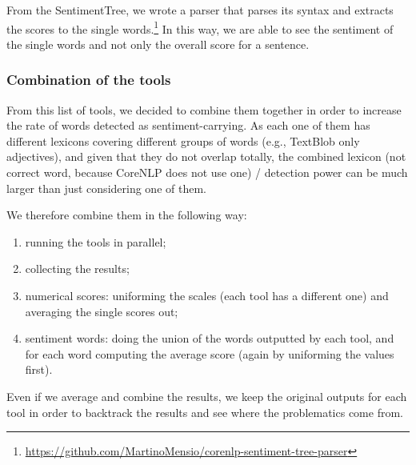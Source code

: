 From the SentimentTree, we wrote a parser that parses its syntax and extracts the scores to the single words.\footnote{\url{https://github.com/MartinoMensio/corenlp-sentiment-tree-parser}}
In this way, we are able to see the sentiment of the single words and not only the overall score for a sentence.

\subsubsection{\statusgreen Combination of the tools}
From this list of tools, we decided to combine them together in order to increase the rate of words detected as sentiment-carrying. As each one of them has different lexicons covering different groups of words (e.g., TextBlob only adjectives), and given that they do not overlap totally, the combined lexicon (not correct word, because CoreNLP does not use one) / detection power can be much larger than just considering one of them.

We therefore combine them in the following way:
\begin{enumerate}
    \item running the tools in parallel;
    \item collecting the results;
    \item numerical scores: uniforming the scales (each tool has a different one) and averaging the single scores out;
    \item sentiment words: doing the union of the words outputted by each tool, and for each word computing the average score (again by uniforming the values first).
\end{enumerate}



Even if we average and combine the results, we keep the original outputs for each tool in order to backtrack the results and see where the problematics come from.

